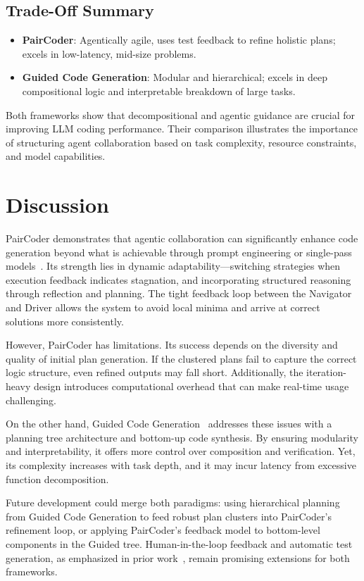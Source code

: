 \documentclass[11pt,a4paper]{article}
\begin{document}
\subsection{Trade-Off Summary}
\begin{itemize}
\item \textbf{PairCoder}: Agentically agile, uses test feedback to refine holistic plans; excels in low-latency, mid-size problems.
\item \textbf{Guided Code Generation}: Modular and hierarchical; excels in deep compositional logic and interpretable breakdown of large tasks.
\end{itemize}

Both frameworks show that decompositional and agentic guidance are crucial for improving LLM coding performance. Their comparison illustrates the importance of structuring agent collaboration based on task complexity, resource constraints, and model capabilities.

\section{Discussion}
PairCoder demonstrates that agentic collaboration can significantly enhance code generation beyond what is achievable through prompt engineering or single-pass models~\cite{zhang2024paircoder}. Its strength lies in dynamic adaptability—switching strategies when execution feedback indicates stagnation, and incorporating structured reasoning through reflection and planning. The tight feedback loop between the Navigator and Driver allows the system to avoid local minima and arrive at correct solutions more consistently.

However, PairCoder has limitations. Its success depends on the diversity and quality of initial plan generation. If the clustered plans fail to capture the correct logic structure, even refined outputs may fall short. Additionally, the iteration-heavy design introduces computational overhead that can make real-time usage challenging.

On the other hand, Guided Code Generation~\cite{almorsi2025guided} addresses these issues with a planning tree architecture and bottom-up code synthesis. By ensuring modularity and interpretability, it offers more control over composition and verification. Yet, its complexity increases with task depth, and it may incur latency from excessive function decomposition.

Future development could merge both paradigms: using hierarchical planning from Guided Code Generation to feed robust plan clusters into PairCoder’s refinement loop, or applying PairCoder’s feedback model to bottom-level components in the Guided tree. Human-in-the-loop feedback and automatic test generation, as emphasized in prior work~\cite{chen2024selfdebugging}, remain promising extensions for both frameworks.
\end{document}
